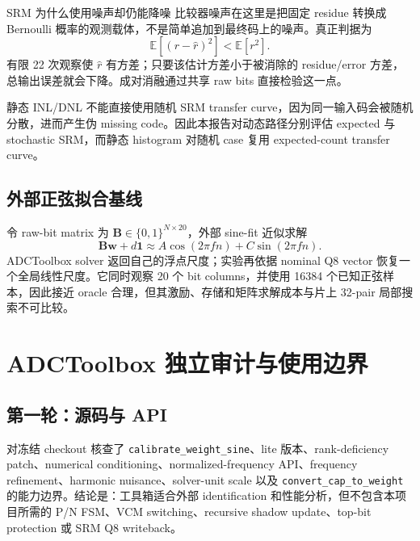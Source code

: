 \documentclass[UTF8,fontset=none,a4paper,11pt,openany]{ctexrep}
\begin{document}
\begin{diagnosticbox}{SRM 为什么使用噪声却仍能降噪}
比较器噪声在这里是把固定 residue 转换成 Bernoulli 概率的观测载体，不是简单追加到最终码上的噪声。真正判据为
\begin{equation*}
\mathbb E\!\left[(r-\widehat r)^2\right]<\mathbb E[r^2].
\end{equation*}
有限 22 次观察使 $\widehat r$ 有方差；只要该估计方差小于被消除的 residue/error 方差，总输出误差就会下降。成对消融通过共享 raw bits 直接检验这一点。
\end{diagnosticbox}

静态 INL/DNL 不能直接使用随机 SRM transfer curve，因为同一输入码会被随机分散，进而产生伪 missing code。因此本报告对动态路径分别评估 expected 与 stochastic SRM，而静态 histogram 对随机 case 复用 expected-count transfer curve。

\section{外部正弦拟合基线}

令 raw-bit matrix 为 $\mathbf B\in\{0,1\}^{N\times20}$，外部 sine-fit 近似求解
\begin{equation}
\mathbf B\bm w+d\bm 1
\approx A\cos(2\pi fn)+C\sin(2\pi fn).
\end{equation}
ADCToolbox solver 返回自己的浮点尺度；实验再依据 nominal Q8 vector 恢复一个全局线性尺度。它同时观察 20 个 bit columns，并使用 16384 个已知正弦样本，因此接近 oracle 合理，但其激励、存储和矩阵求解成本与片上 32-pair 局部搜索不可比较。

\chapter{ADCToolbox 独立审计与使用边界}

\section{第一轮：源码与 API}

对冻结 checkout 核查了 \texttt{calibrate\_weight\_sine}、lite 版本、rank-deficiency patch、numerical conditioning、normalized-frequency API、frequency refinement、harmonic nuisance、solver-unit scale 以及 \texttt{convert\_cap\_to\_weight} 的能力边界。结论是：工具箱适合外部 identification 和性能分析，但不包含本项目所需的 P/N FSM、VCM switching、recursive shadow update、top-bit protection 或 SRM Q8 writeback。
\end{document}

